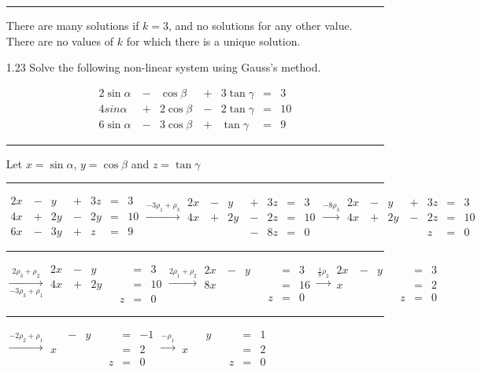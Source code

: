 \documentclass{article}
\begin{document}
\begin{enumerate}
\hrule

There are many solutions if $k=3$, and no solutions for any other value. There are no values of $k$ for which there is a unique solution.

\item[1.23]Solve the following non-linear system using Gauss's method.

\[\begin{aligned}
2\sin\alpha&\ -&\cos\beta&\ +&3\tan\gamma&=&3\\
4sin\alpha&\ +&2\cos\beta&\ -&2\tan\gamma&=&10\\
6\sin\alpha&\ -&3\cos\beta&\ +&\tan\gamma&=&9
\end{aligned}\]

\hrule

Let $x=\sin\alpha$, $y=\cos\beta$ and $z=\tan\gamma$

\hrule

$\begin{aligned}
2x&\ -&y&\ +&3z&=&3\\
4x&\ +&2y&\ -&2y&=&10\\
6x&\ -&3y&\ +&z&=&9
\end{aligned}
\overset{-3\rho_1+\rho_3}{\longrightarrow}
\begin{aligned}
2x&\ -&y&\ +&3z&=&3\\
4x&\ +&2y&\ -&2z&=&10\\
&&&\ -&8z&=&0
\end{aligned}
\overset{-8\rho_3}{\longrightarrow}
\begin{aligned}
2x&\ -&y&\ +&3z&=&3\\
4x&\ +&2y&\ -&2z&=&10\\
&&&&z&=&0
\end{aligned}$

\hrule

$\underset{-3\rho_3+\rho_1}{\overset{2\rho_3+\rho_2}{\longrightarrow}}
\begin{aligned}
2x&\ -&y&&&=&3\\
4x&\ +&2y&&&=&10\\
&&&&z&=&0
\end{aligned}
\overset{2\rho_1+\rho_2}{\longrightarrow}
\begin{aligned}
2x&\ -&y&&&=&3\\
8x&&&&&=&16\\
&&&&z&=&0
\end{aligned}
\overset{\frac{1}{8}\rho_2}{\longrightarrow}
\begin{aligned}
2x&\ -&y&&&=&3\\
x&&&&&=&2\\
&&&&z&=&0
\end{aligned}$

\hrule

$\overset{-2\rho_2+\rho_1}{\longrightarrow}
\begin{aligned}
&\ -&y&&&=&-1\\
x&&&&&=&2\\
&&&&z&=&0
\end{aligned}
\overset{-\rho_1}{\longrightarrow}
\begin{aligned}
&&y&&&=&1\\
x&&&&&=&2\\
&&&&z&=&0
\end{aligned}$

\end{enumerate}
\end{document}
